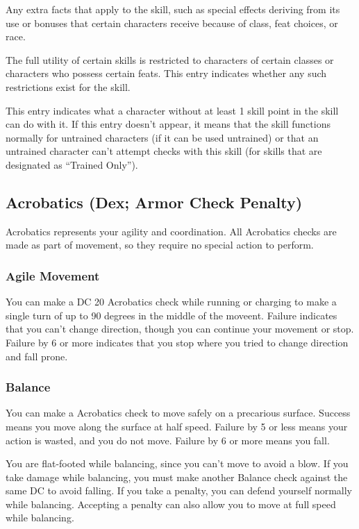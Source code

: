  Any extra facts that apply to the skill, such as special effects deriving from its use or bonuses that certain characters receive because of class, feat choices, or race.

 The full utility of certain skills is restricted to characters of certain classes or characters who possess certain feats. This entry indicates whether any such restrictions exist for the skill.

 This entry indicates what a character without at least 1 skill point in the skill can do with it. If this entry doesn't appear, it means that the skill functions normally for untrained characters (if it can be used untrained) or that an untrained character can't attempt checks with this skill (for skills that are designated as ``Trained Only'').

\subsection{Acrobatics (Dex; Armor Check Penalty)}
Acrobatics represents your agility and coordination. All Acrobatics checks are made as part of movement, so they require no special action to perform.

\subsubsection{Agile Movement}
You can make a DC 20 Acrobatics check while running or charging to make a single turn of up to 90 degrees in the middle of the moveent. Failure indicates that you can't change direction, though you can continue your movement or stop. Failure by 6 or more indicates that you stop where you tried to change direction and fall prone.

\subsubsection{Balance}
You can make a Acrobatics check to move safely on a precarious surface. Success means you move along the surface at half speed. Failure by 5 or less means your action is wasted, and you do not move. Failure by 6 or more means you fall.

You are flat-footed while balancing, since you can't move to avoid a blow. If you take damage while balancing, you must make another Balance check against the same DC to avoid falling. If you take a  penalty, you can defend yourself normally while balancing. Accepting a  penalty can also allow you to move at full speed while balancing.

